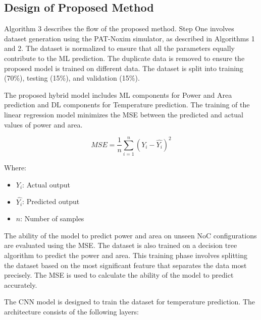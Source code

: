 \documentclass[conference]{IEEEtran}
\begin{document}
\subsection{Design of Proposed Method}
Algorithm 3 describes the flow of the proposed method. Step One involves dataset generation using the PAT-Noxim simulator, as described in Algorithms 1 and 2. The dataset is normalized to ensure that all the parameters equally contribute to the ML prediction. The duplicate data is removed to ensure the proposed model is trained on different data. The dataset is split into training (70\%), testing (15\%), and validation (15\%).

The proposed hybrid model includes ML components for Power and Area prediction and DL components for Temperature prediction. The training of the linear regression model minimizes the MSE between the predicted and actual values of power and area. 

\[
MSE = \frac{1}{n} \sum_{i=1}^{n} \left( Y_i - \hat{Y_i} \right)^2
\]

Where:
\begin{itemize}
    \item \( Y_i \): Actual output
    \item \( \hat{Y_i} \): Predicted output
    \item \( n \): Number of samples
\end{itemize}
The ability of the model to predict power and area on unseen NoC configurations are evaluated using the MSE.
The dataset is also trained on a decision tree algorithm to predict the power and area. This training phase involves splitting the dataset based on the most significant feature that separates the data most precisely. The MSE is used to calculate the ability of the model to predict accurately. 

The CNN model is designed to train the dataset for temperature prediction. The architecture consists of the following layers:
\end{document}
